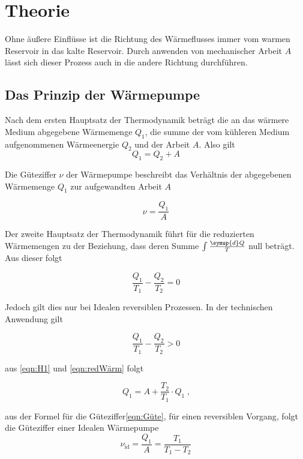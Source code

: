 \section{Theorie}
\label{sec:Theorie}
Ohne äußere Einflüsse ist die Richtung des Wärmeflusses immer vom warmen Reservoir in das kalte Reservoir.
Durch anwenden von mechanischer Arbeit $A$ lässt sich dieser Prozess auch in die andere Richtung durchführen.
\subsection{Das Prinzip der Wärmepumpe}
Nach dem ersten Hauptsatz der Thermodynamik beträgt die an das wärmere Medium abgegebene Wärmemenge $Q_1$, die summe der vom kühleren Medium aufgenommenen
Wärmeenergie $Q_2$ und der Arbeit $A$. Also gilt
\begin{equation}
    Q_1=Q_2+A
    \label{eqn:H1}
\end{equation}

Die Güteziffer $\nu$ der Wärmepumpe beschreibt das Verhältnis der abgegebenen
Wärmemenge $Q_1$ zur aufgewandten Arbeit $A$

\begin{equation}
    \nu=\frac{Q_1}{A}
    \label{eqn:Güte}
\end{equation}

Der zweite Hauptsatz der Thermodynamik führt für die reduzierten Wärmemengen 
zu der Beziehung, dass deren Summe $\int \frac{\symup{d}Q}{T}$ null beträgt. 
Aus dieser folgt

\begin{equation}
    \frac{Q_1}{T_1} - \frac{Q_2}{T_2} = 0
    \label{eqn:redWärm}
\end{equation}

Jedoch gilt dies nur bei Idealen reversiblen Prozessen. In der technischen Anwendung gilt

\begin{equation}
    \frac{Q_1}{T_1} - \frac{Q_2}{T_2} > 0
    \label{eqn:ungWärme}
\end{equation}

aus \ref{eqn:H1} und \ref{eqn:redWärm} folgt

\begin{equation*}
    Q_1 = A + \frac{T_2}{T_1} \cdot Q_1 \; \text{,}
\end{equation*}

aus der Formel für die Güteziffer\ref{eqn:Güte}, für einen reversiblen Vorgang, folgt die Güteziffer einer Idealen Wärmepumpe
\begin{equation}
    \nu_\text{id} = \frac{Q_1}{A} = \frac{T_1}{T_1 - T_2}
    \label{eqn:Id}
\end{equation}

